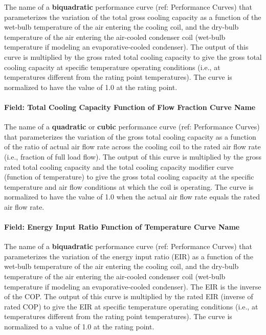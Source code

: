 The name of a \textbf{biquadratic} performance curve (ref: Performance Curves) that parameterizes the variation of the total gross cooling capacity as a function of the wet-bulb temperature of the air entering the cooling coil, and the dry-bulb temperature of the air entering the air-cooled condenser coil (wet-bulb temperature if modeling an evaporative-cooled condenser). The output of this curve is multiplied by the gross rated total cooling capacity to give the gross total cooling capacity at specific temperature operating conditions (i.e., at temperatures different from the rating point temperatures). The curve is normalized to have the value of 1.0 at the rating point.

\paragraph{Field: Total Cooling Capacity Function of Flow Fraction Curve Name}\label{field-total-cooling-capacity-function-of-flow-fraction-curve-name-2}

The name of a \textbf{quadratic} or \textbf{cubic} performance curve (ref: Performance Curves) that parameterizes the variation of the gross total cooling capacity as a function of the ratio of actual air flow rate across the cooling coil to the rated air flow rate (i.e., fraction of full load flow). The output of this curve is multiplied by the gross rated total cooling capacity and the total cooling capacity modifier curve (function of temperature) to give the gross total cooling capacity at the specific temperature and air flow conditions at which the coil is operating. The curve is normalized to have the value of 1.0 when the actual air flow rate equals the rated air flow rate.

\paragraph{Field: Energy Input Ratio Function of Temperature Curve Name}\label{field-energy-input-ratio-function-of-temperature-curve-name-2}

The name of a \textbf{biquadratic} performance curve (ref: Performance Curves) that parameterizes the variation of the energy input ratio (EIR) as a function of the wet-bulb temperature of the air entering the cooling coil, and the dry-bulb temperature of the air entering the air-cooled condenser coil (wet-bulb temperature if modeling an evaporative-cooled condenser). The EIR is the inverse of the COP. The output of this curve is multiplied by the rated EIR (inverse of rated COP) to give the EIR at specific temperature operating conditions (i.e., at temperatures different from the rating point temperatures). The curve is normalized to a value of 1.0 at the rating point.

